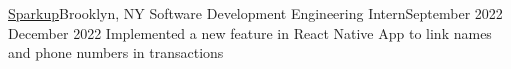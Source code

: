 \resumeSubheading
{\href{https://sparkupbiz.us}{Sparkup}}{Brooklyn, NY}
{Software Development Engineering Intern}{September 2022 \textemdash December 2022}
\resumeItemListStart
{}
{Implemented a new feature in React Native App to link names and phone numbers in transactions}
\resumeItemListEnd
